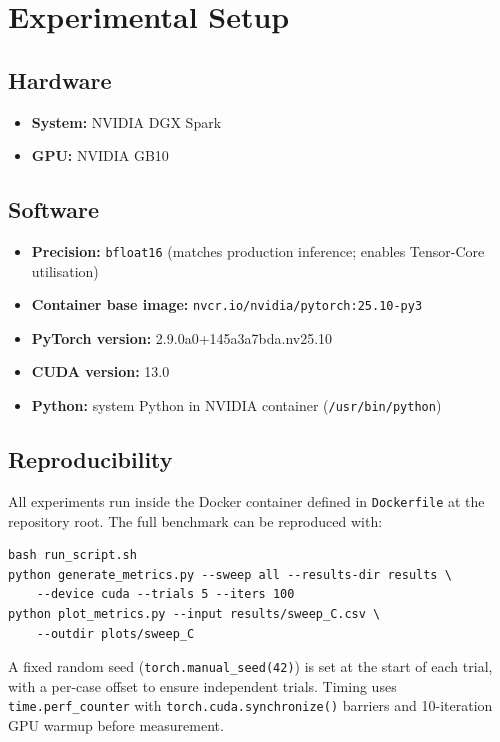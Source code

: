 \documentclass{article} %
\begin{document}
\section{Experimental Setup}
\label{sec:setup}

\subsection{Hardware}

\begin{itemize}
  \item \textbf{System:} NVIDIA DGX Spark
  \item \textbf{GPU:} NVIDIA GB10
\end{itemize}

\subsection{Software}

\begin{itemize}
  \item \textbf{Precision:} \texttt{bfloat16} (matches production inference; enables Tensor-Core utilisation)
  \item \textbf{Container base image:} \texttt{nvcr.io/nvidia/pytorch:25.10-py3}
  \item \textbf{PyTorch version:} 2.9.0a0+145a3a7bda.nv25.10
  \item \textbf{CUDA version:} 13.0
  \item \textbf{Python:} system Python in NVIDIA container (\texttt{/usr/bin/python})
\end{itemize}

\subsection{Reproducibility}

All experiments run inside the Docker container defined in \texttt{Dockerfile} at the
repository root. The full benchmark can be reproduced with:

\begin{verbatim}
bash run_script.sh
python generate_metrics.py --sweep all --results-dir results \
    --device cuda --trials 5 --iters 100
python plot_metrics.py --input results/sweep_C.csv \
    --outdir plots/sweep_C
\end{verbatim}

A fixed random seed (\texttt{torch.manual\_seed(42)}) is set at the start of each
trial, with a per-case offset to ensure independent trials. Timing uses
\texttt{time.perf\_counter} with \texttt{torch.cuda.synchronize()} barriers and
10-iteration GPU warmup before measurement.
\end{document}
